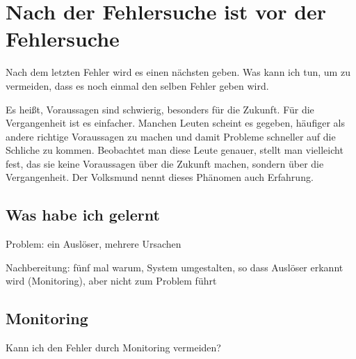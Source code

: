 \chapter{Nach der Fehlersuche ist vor der Fehlersuche}
\label{cha:ausblick}

\begin{abstractsec}
  Nach dem letzten Fehler wird es einen nächsten geben. Was kann ich tun, um
  zu vermeiden, dass es noch einmal den selben Fehler geben wird.
\end{abstractsec}

\begin{normaltext}
  Es heißt, Voraussagen sind schwierig, besonders für die Zukunft. Für die
  Vergangenheit ist es einfacher.
  Manchen Leuten scheint es gegeben, häufiger als andere richtige Voraussagen
  zu machen und damit Probleme schneller auf die Schliche zu kommen.
  Beobachtet man diese Leute genauer, stellt man vielleicht fest, das sie
  keine Voraussagen über die Zukunft machen, sondern über die Vergangenheit.
  Der Volksmund nennt dieses Phänomen auch Erfahrung.
\end{normaltext}

\section{Was habe ich gelernt}
\label{sec:was-habe-ich-gelernt}

\begin{notes}
\item Problem: ein Auslöser, mehrere Ursachen
  
  Nachbereitung: fünf mal warum, System umgestalten, so dass Auslöser erkannt
  wird (Monitoring), aber nicht zum Problem führt
\end{notes}

\section{Monitoring}
\label{sec:monitoring}

\begin{notes}
\item Kann ich den Fehler durch Monitoring vermeiden?
\end{notes}

